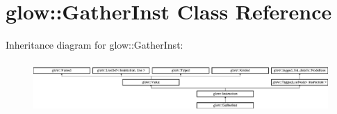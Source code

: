\hypertarget{classglow_1_1_gather_inst}{}\section{glow\+:\+:Gather\+Inst Class Reference}
\label{classglow_1_1_gather_inst}
Inheritance diagram for glow\+:\+:Gather\+Inst\+:\begin{figure}[H]
\begin{center}
\leavevmode
\includegraphics[height=1.991111cm]{classglow_1_1_gather_inst}
\end{center}
\end{figure}
